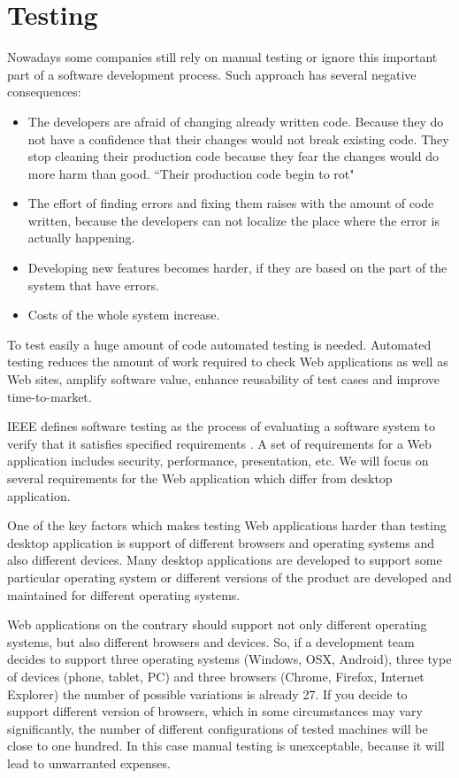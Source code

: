 \section{Testing}
		Nowadays some companies still rely on manual testing or ignore this
		important part of a software development process. Such approach has several
		negative consequences:
		\begin{itemize}
			\item The developers are afraid of changing already written
			code. Because they do not have a confidence that their changes would not 
			break existing code. They stop cleaning their production code because they
			fear the changes would do more harm than good. ``Their production code begin
			to rot"
			\cite[p.123]{cleancode} 
			
			\item The effort of finding errors and	fixing them raises with the amount of
			code written, because the developers can not localize the place where the
			error is actually happening.
			\item Developing new features becomes harder, if they are based on the part
			of the system that have errors.
		
			\item Costs of the whole system increase.
	 	 \end{itemize}
	 	 
	 	 To test easily a huge amount of code automated testing is needed.	
	 	 Automated testing reduces the amount of work required to check Web applications as
	 	 well as Web sites, amplify software value, enhance reusability of test cases and improve time-to-market.
	   
		IEEE defines software testing as the process of evaluating a software
		system to verify that it satisfies specified requirements \cite{Xu1}. A set of
		requirements for a Web application includes security, performance,
		presentation, etc. We will focus on several requirements for the Web
		application which differ from desktop application. 
		
		One of the key factors which makes testing Web applications harder than
		testing desktop application is support of different browsers and operating systems and also
		different devices. Many desktop applications are developed to support some
		particular operating system or different versions of the product are developed
		and maintained for different operating systems. 
		
		Web applications on the	contrary should support not only different operating systems, but also
		different browsers and devices. So, if a development team decides to support
		three operating systems (Windows, OSX, Android), three type of devices (phone,
		tablet, PC) and three browsers (Chrome, Firefox, Internet Explorer) the number
		of possible variations is already 27. If you decide to support
		different version of browsers, which in some circumstances may vary significantly,
		the number of different configurations of tested machines will be close to
		one hundred. In this case manual testing is unexceptable, because it will lead
		to unwarranted expenses. 
		
